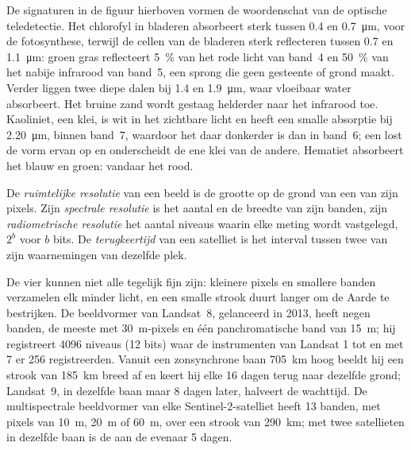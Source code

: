 De signaturen in de figuur hierboven vormen de woordenschat van de optische
teledetectie. Het chlorofyl in bladeren absorbeert sterk tussen 0.4 en
\qty{0.7}{\micro\metre}, voor de fotosynthese, terwijl de cellen van de bladeren
sterk reflecteren tussen 0.7 en \qty{1.1}{\micro\metre}: groen gras reflecteert
\qty{5}{\percent} van het rode licht van band~4 en \qty{50}{\percent} van het
nabije infrarood van band~5, een sprong die geen gesteente of grond maakt. Verder
liggen twee diepe dalen bij 1.4 en \qty{1.9}{\micro\metre}, waar vloeibaar water
absorbeert. Het bruine zand wordt gestaag helderder naar het infrarood toe. Kaoliniet,
een klei, is wit in het zichtbare licht en heeft een smalle absorptie bij
\qty{2.20}{\micro\metre}, binnen band~7, waardoor het daar donkerder is dan
in band~6; een  lost de vorm ervan op en onderscheidt de ene klei
van de andere. Hematiet absorbeert het blauw en groen: vandaar het rood.

\begin{definition}\label{def:b3:remote-sensing-gis:resolutions}
De \emph{ruimtelijke resolutie} van een beeld is de
grootte op de grond van een van zijn pixels. Zijn \emph{spectrale
resolutie} is het aantal en de breedte van zijn
banden, zijn \emph{radiometrische resolutie} het
aantal niveaus waarin elke meting wordt vastgelegd, $2^b$ voor $b$ bits.
De \emph{terugkeertijd} van een satelliet is het interval
tussen twee van zijn waarnemingen van dezelfde plek.
\end{definition}

De vier kunnen niet alle tegelijk fijn zijn: kleinere pixels en smallere banden
verzamelen elk minder licht, en een smalle strook duurt langer om de
Aarde te bestrijken. De beeldvormer van Landsat~8, gelanceerd in 2013, heeft negen banden, de meeste
met \qty{30}{m}-pixels en één panchromatische band van \qty{15}{m}; hij
registreert 4096 niveaus (12 bits) waar de instrumenten van Landsat 1 tot en met 7
er 256 registreerden. Vanuit een zonsynchrone baan \qty{705}{km} hoog beeldt hij een
strook van \qty{185}{km} breed af en keert hij elke 16 dagen terug naar dezelfde grond;
Landsat~9, in dezelfde baan maar 8 dagen later, halveert de wachttijd. De
multispectrale beeldvormer van elke Sentinel-2-satelliet heeft 13 banden, met
pixels van \qty{10}{m}, \qty{20}{m} of \qty{60}{m}, over een strook van \qty{290}{km}; met twee satellieten in
dezelfde baan is de  aan de evenaar 5 dagen.

